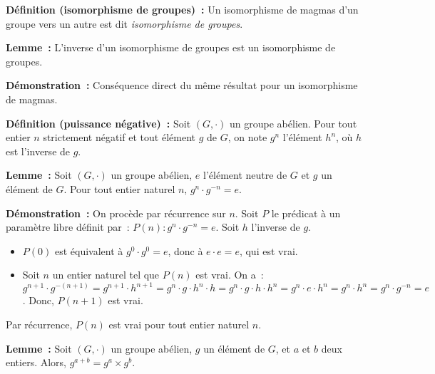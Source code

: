 \noindent\textbf{Définition (isomorphisme de groupes) :} Un isomorphisme de magmas d'un groupe vers un autre est dit \textit{isomorphisme de groupes}.

\medskip

\noindent\textbf{Lemme :} L'inverse d'un isomorphisme de groupes est un isomorphisme de groupes.

\medskip

\noindent\textbf{Démonstration :} Conséquence direct du même résultat pour un isomorphisme de magmas.

\medskip

\noindent\textbf{Définition (puissance négative) :} Soit $(G,\cdot)$ un groupe abélien. 
    Pour tout entier $n$ strictement négatif et tout élément $g$ de $G$, on note $g^n$ l'élément $h^n$, où $h$ est l'inverse de $g$.

\medskip

\noindent\textbf{Lemme :} Soit $(G,\cdot)$ un groupe abélien, $e$ l'élément neutre de $G$ et $g$ un élément de $G$.
    Pour tout entier naturel $n$, $g^n \cdot g^{-n} = e$.

\medskip

\noindent\textbf{Démonstration :} 
    On procède par récurrence sur $n$. 
    Soit $P$ le prédicat à un paramètre libre définit par : $P(n): g^n \cdot g^{-n} = e$.
    Soit $h$ l'inverse de $g$. 
    \begin{itemize}[nosep]
        \item $P(0)$ est équivalent à $g^0 \cdot g^0 = e$, donc à $e \cdot e = e$, qui est vrai.
        \item Soit $n$ un entier naturel tel que $P(n)$ est vrai.
            On a : $g^{n+1} \cdot g^{-(n+1)} = g^{n+1} \cdot h^{n+1} = g^n \cdot g \cdot h^n \cdot h = g^n \cdot g \cdot h \cdot h^n = g^n \cdot e \cdot h^n = g^n \cdot h^n = g^n \cdot g^{-n} = e$.
            Donc, $P(n+1)$ est vrai.
    \end{itemize}
    Par récurrence, $P(n)$ est vrai pour tout entier naturel $n$.

    \done

\medskip

\noindent\textbf{Lemme :} Soit $(G,\cdot)$ un groupe abélien, $g$ un élément de $G$, et $a$ et $b$ deux entiers.
    Alors, $g^{a+b} = g^a \times g^b$.

\medskip

